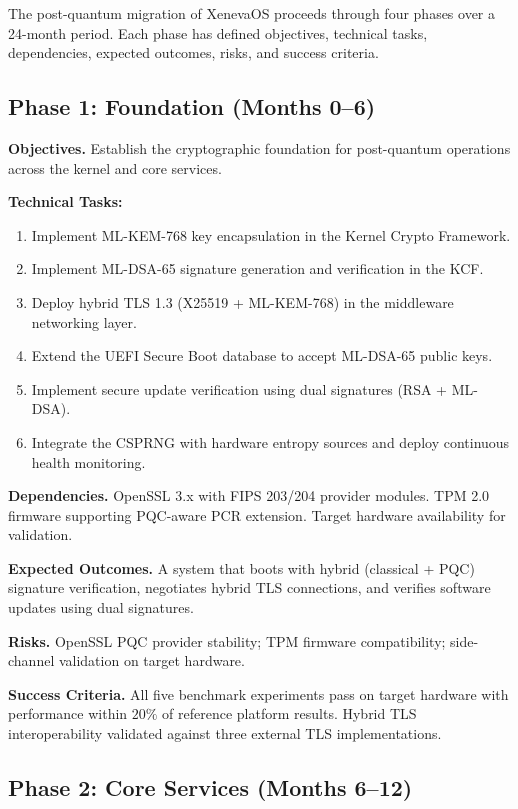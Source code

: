 \documentclass[11pt, a4paper]{article}
\begin{document}
The post-quantum migration of XenevaOS proceeds through four phases over a 24-month period. Each phase has defined objectives, technical tasks, dependencies, expected outcomes, risks, and success criteria.

\subsection{Phase 1: Foundation (Months 0--6)}\label{sec:phase1}

\textbf{Objectives.} Establish the cryptographic foundation for post-quantum operations across the kernel and core services.

\textbf{Technical Tasks:}
\begin{enumerate}
    \item Implement ML-KEM-768 key encapsulation in the Kernel Crypto Framework.
    \item Implement ML-DSA-65 signature generation and verification in the KCF.
    \item Deploy hybrid TLS 1.3 (X25519 + ML-KEM-768) in the middleware networking layer.
    \item Extend the UEFI Secure Boot database to accept ML-DSA-65 public keys.
    \item Implement secure update verification using dual signatures (RSA + ML-DSA).
    \item Integrate the CSPRNG with hardware entropy sources and deploy continuous health monitoring.
\end{enumerate}

\textbf{Dependencies.} OpenSSL 3.x with FIPS 203/204 provider modules. TPM 2.0 firmware supporting PQC-aware PCR extension. Target hardware availability for validation.

\textbf{Expected Outcomes.} A system that boots with hybrid (classical + PQC) signature verification, negotiates hybrid TLS connections, and verifies software updates using dual signatures.

\textbf{Risks.} OpenSSL PQC provider stability; TPM firmware compatibility; side-channel validation on target hardware.

\textbf{Success Criteria.} All five benchmark experiments pass on target hardware with performance within $20\%$ of reference platform results. Hybrid TLS interoperability validated against three external TLS implementations.

\subsection{Phase 2: Core Services (Months 6--12)}\label{sec:phase2}
\end{document}
